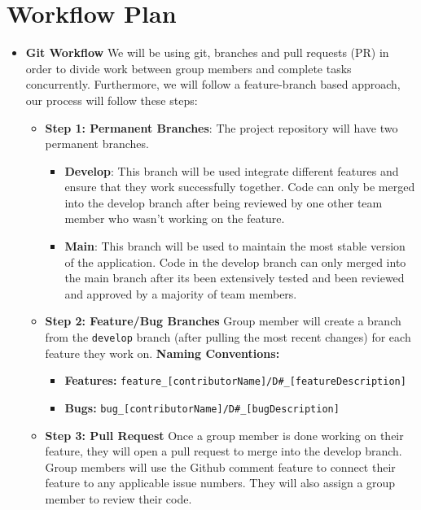 \documentclass{article}
\begin{document}
\section{Workflow Plan}

\begin{itemize}
	\item\textbf{Git Workflow \newline}
	 We will be using git, branches and pull requests (PR) in order to divide work between group members and complete tasks concurrently. 
   Furthermore, we will follow a feature-branch based approach, our process will follow these steps:
   \begin{itemize}
    \item \textbf{Step 1: Permanent Branches}: The project repository will have two permanent branches. 
   \begin{itemize}
      \item \textbf{Develop}: This branch will be used integrate different features and ensure that they work successfully together. Code can only be merged into the develop branch after being reviewed by one other team member who wasn't working on the feature. 
      \item \textbf{Main}: This branch will be used to maintain the most stable version of the application. Code in the develop branch can only merged into the main branch after its been extensively tested and been reviewed and approved by a majority of team members. 
    \end{itemize}

    \item \textbf{Step 2: Feature/Bug Branches} Group member will create a branch from the \texttt{develop} branch (after pulling the most recent changes) for each feature they work on. \newline
    \textbf{Naming Conventions:}
    \begin{itemize}
      \item \textbf{Features: }\texttt{feature\_[contributorName]/D\#\_[featureDescription]} 
      \item \textbf{Bugs: }  \texttt{bug\_[contributorName]/D\#\_[bugDescription]}
    \end{itemize}

  \item \textbf{Step 3: Pull Request} Once a group member is done working on their feature, they will open a pull request to merge into the develop branch. Group members will use the Github comment feature to connect their feature to any applicable issue numbers. They will also assign a group member to review their code.
    \end{itemize}


\end{itemize}
\end{document}
